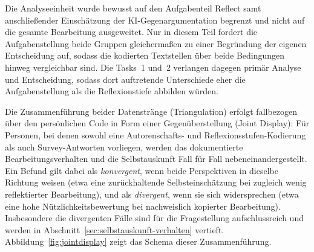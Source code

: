 Die Analyseeinheit wurde bewusst auf den Aufgabenteil \glqq Reflect\grqq{} samt anschließender
Einschätzung der KI-Gegenargumentation begrenzt und nicht auf die gesamte Bearbeitung ausgeweitet.
Nur in diesem Teil fordert die Aufgabenstellung beide Gruppen gleichermaßen zu einer Begründung der
eigenen Entscheidung auf, sodass die kodierten Textstellen über beide Bedingungen hinweg vergleichbar
sind. Die Tasks~1 und~2 verlangen dagegen primär Analyse und Entscheidung, sodass dort auftretende
Unterschiede eher die Aufgabenstellung als die Reflexionstiefe abbilden würden.

Die Zusammenführung beider Datenstränge (Triangulation) erfolgt fallbezogen über den persönlichen
Code in Form einer Gegenüberstellung (Joint Display): Für Personen, bei denen sowohl eine
Autorenschafts- und Reflexionsstufen-Kodierung als auch Survey-Antworten vorliegen, werden das
dokumentierte Bearbeitungsverhalten und die Selbstauskunft Fall für Fall nebeneinandergestellt. Ein
Befund gilt dabei als \emph{konvergent}, wenn beide Perspektiven in dieselbe Richtung weisen (etwa
eine zurückhaltende Selbsteinschätzung bei zugleich wenig reflektierter Bearbeitung), und als
\emph{divergent}, wenn sie sich widersprechen (etwa eine hohe Nützlichkeitsbewertung bei nachweislich
kopierter Bearbeitung). Insbesondere die divergenten Fälle sind für die Fragestellung aufschlussreich
und werden in Abschnitt~\ref{sec:selbstauskunft-verhalten} vertieft.
Abbildung~\ref{fig:jointdisplay} zeigt das Schema dieser Zusammenführung.

